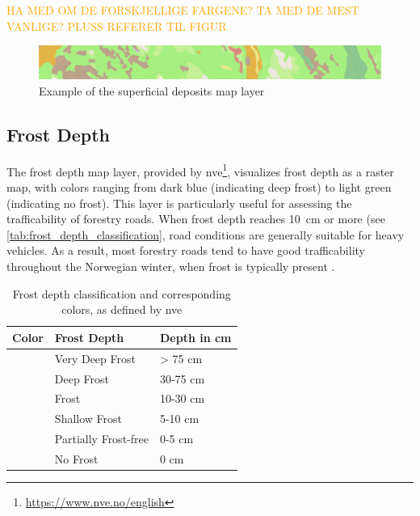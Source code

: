 \textcolor{orange}{HA MED OM DE FORSKJELLIGE FARGENE? TA MED DE MEST VANLIGE? PLUSS REFERER TIL FIGUR}

\begin{figure}[h]
    \centering
    \includegraphics[width=1\linewidth]{images/maplayers/superficialdeposits.png}
    \caption{Example of the superficial deposits map layer}
    \label{fig:maplayer:superficialdeposit}
\end{figure}

\subsection{Frost Depth}\label{subsec:frostdepth}

The frost depth map layer, provided by \acrfull{nve}\footnote{\url{https://www.nve.no/english}}, visualizes frost depth as a raster map, with colors ranging from dark blue (indicating deep frost) to light green (indicating no frost). This layer is particularly useful for assessing the trafficability of forestry roads. When frost depth reaches \qty{10}{\centi\meter} or more (see \autoref{tab:frost_depth_classification}, road conditions are generally suitable for heavy vehicles. As a result, most forestry roads tend to have good trafficability throughout the Norwegian winter, when frost is typically present \cite{wiki:tele}.

\begin{table}[h]
    \centering
    \begin{tabular}{|l|l|l|}
        \hline  
        \textbf{Color} & \textbf{Frost Depth} & \textbf{Depth in cm} \\
        \hline
        \cellcolor[HTML]{00009c} & Very Deep Frost & > 75 cm \\
        \hline
        \cellcolor[HTML]{0018ff} & Deep Frost & 30-75 cm \\
        \hline
        \cellcolor[HTML]{009aff} & Frost & 10-30 cm \\
        \hline
        \cellcolor[HTML]{84ebff} & Shallow Frost & 5-10 cm \\
        \hline
        \cellcolor[HTML]{deffff} & Partially Frost-free & 0-5 cm \\
        \hline
        \cellcolor[HTML]{cef77b} & No Frost & 0 cm \\
        \hline
    \end{tabular}
    \caption[Frost depth classification and corresponding colors]{Frost depth classification and corresponding colors, as defined by \acrshort{nve} \cite{nve2025waterdata}}
    \label{tab:frost_depth_classification}
\end{table}

